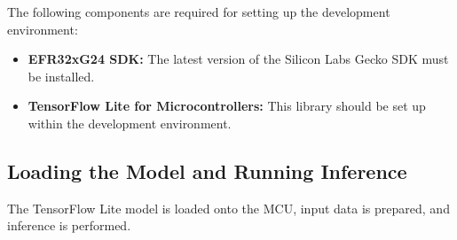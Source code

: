 \documentclass[
  9pt,
  letterpaper,
  abstract,
  titlepage]{scrbook}
\begin{document}
The following components are required for setting up the development
environment:

\begin{itemize}
\item
  \textbf{EFR32xG24 SDK:} The latest version of the Silicon Labs Gecko
  SDK must be installed.
\item
  \textbf{TensorFlow Lite for Microcontrollers:} This library should be
  set up within the development environment.
\end{itemize}

\subsection{Loading the Model and Running
Inference}\label{loading-the-model-and-running-inference}

The TensorFlow Lite model is loaded onto the MCU, input data is
prepared, and inference is performed.
\end{document}
